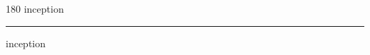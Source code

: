 
\begin{frame}
\begin{center}
\begin{turn}{180}
{\fontsize{2.5cm}{1em}\selectfont inception}
\end{turn}
\vspace{1em}\par  
\hrule
\vspace{1em}\par  
{\fontsize{2.5cm}{1em}\selectfont inception}
\end{center}
\end{frame}
